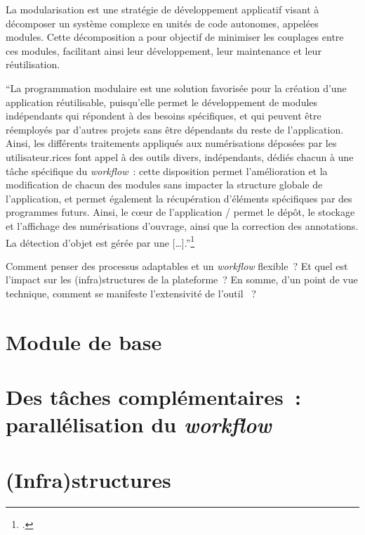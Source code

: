 

La modularisation est une stratégie de développement applicatif visant à
décomposer un système complexe en unités de code autonomes, appelées
modules. Cette décomposition a pour objectif de minimiser les couplages
entre ces modules, facilitant ainsi leur développement, leur maintenance
et leur réutilisation.

\begin{kwote}
``La programmation modulaire est une solution favorisée pour la création
d'une application réutilisable, puisqu'elle permet le développement de
modules indépendants qui répondent à des besoins spécifiques, et qui
peuvent être réemployés par d'autres projets sans être dépendants du
reste de l'application. Ainsi, les différents traitements appliqués aux
numérisations déposées par les utilisateur.rices font appel à des outils
divers, indépendants, dédiés chacun à une tâche spécifique du \textit{workflow}~:
cette disposition permet l'amélioration et la modification de chacun des
modules sans impacter la structure globale de l'application, et permet
également la récupération d'éléments spécifiques par des programmes
futurs. Ainsi, le cœur de l'application \eida /  permet le dépôt, le
stockage et l'aﬀichage des numérisations d'ouvrage, ainsi que la
correction des annotations. La détection d'objet est gérée par une \api
{[}\ldots{]}.''\footcite[p.52]{norindr_traitement_2023}
\end{kwote}

Comment penser des processus adaptables et un \textit{workflow} flexible~? Et
quel est l'impact sur les (infra)structures de la plateforme~? En somme,
d'un point de vue technique, comment se manifeste
l'extensivité de l'outil \aikon~?

\hypertarget{module-de-base}{%
\section{Module de base}\label{module-de-base}}



\hypertarget{les-taches}{%
\section{Des tâches complémentaires~: parallélisation du
\emph{workflow}}\label{les-taches}}



\hypertarget{infrastructures}{%
\section{(Infra)structures}\label{infrastructures}}

